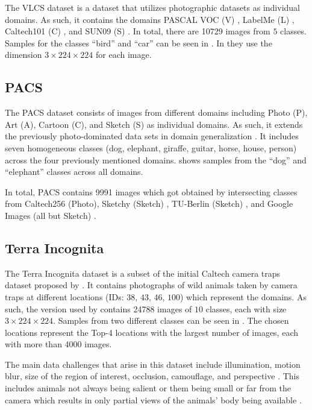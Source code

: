 The VLCS dataset \citep{FangXR13} is a dataset that utilizes photographic datasets as individual domains. As such, it contains the domains PASCAL VOC (V) \citep{EveringhamGWWZ10}, LabelMe (L) \citep{RussellTMF08}, Caltech101 (C) \citep{Fei-FeiFP07}, and SUN09 (S) \citep{ChoiLTW10}. In total, there are \num{10729} images from $5$ classes. Samples for the classes ``bird'' and ``car'' can be seen in . In \citet{gulrajani2020search} they use the dimension $3 \times 224 \times 224$ for each image. 

\subsection{PACS}
The PACS dataset \citep{LiYSH17} consists of images from different domains including Photo (P), Art (A), Cartoon (C), and Sketch (S) as individual domains. As such, it extends the previously photo-dominated data sets in domain generalization \citep{LiYSH17}. It includes seven homogeneous classes (dog, elephant, giraffe, guitar, horse, house, person) across the four previously mentioned domains.  shows samples from the ``dog'' and ``elephant'' classes across all domains. 

In total, PACS contains \num{9991} images which got obtained by intersecting classes from Caltech256 (Photo), Sketchy (Sketch) \citep{SangkloyBHH16}, TU-Berlin (Sketch) \citep{EitzHA12}, and Google Images (all but Sketch) \citep{LiYSH17}.


\subsection{Terra Incognita}
The Terra Incognita dataset is a subset of the initial Caltech camera traps dataset proposed by \citet{BeeryHP18}. It contains photographs of wild animals taken by camera traps at different locations (IDs: $38$, $43$, $46$, $100$) which represent the domains. As such, the version used by \citet{gulrajani2020search} contains \num{24788} images of $10$ classes, each with size $3\times 224 \times 224$. Samples from two different classes can be seen in . The chosen locations represent the Top-4 locations with the largest number of images, each with more than \num{4000} images. 

The main data challenges that arise in this dataset include illumination, motion blur, size of the region of interest, occlusion, camouflage, and perspective \citep{BeeryHP18}. This includes animals not always being salient or them being small or far from the camera which results in only partial views of the animals' body being available \citep{BeeryHP18}. 

